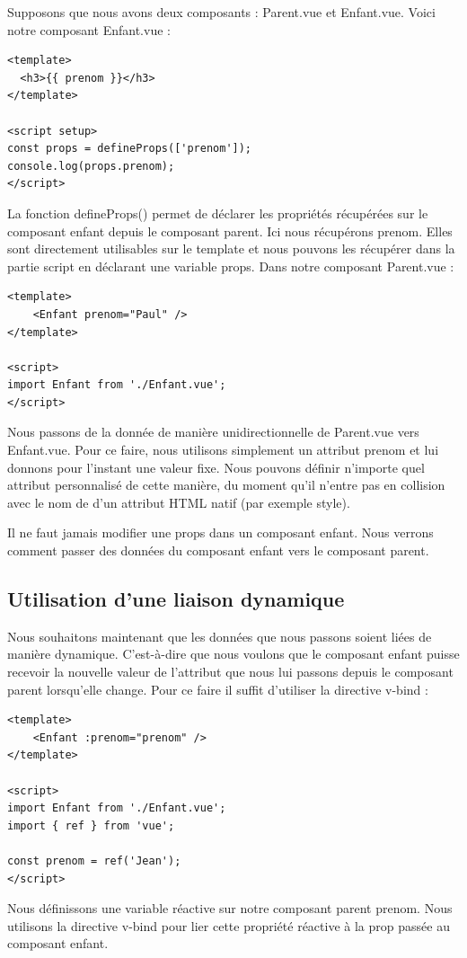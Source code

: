 \documentclass{article}
\begin{document}
Supposons que nous avons deux composants : {\color{monOrange}Parent.vue} et {\color{monOrange}Enfant.vue}. Voici notre composant {\color{monOrange}Enfant.vue} :
\begin{verbatim}
<template>
  <h3>{{ prenom }}</h3>
</template>

<script setup>
const props = defineProps(['prenom']);
console.log(props.prenom);
</script>
\end{verbatim}
La fonction {\color{monOrange}defineProps()} permet de déclarer les propriétés récupérées sur le composant enfant depuis le composant parent. Ici nous récupérons {\color{monOrange}prenom}. Elles sont directement utilisables sur le {\color{monOrange}template} et nous pouvons les récupérer dans la partie {\color{monOrange}script} en déclarant une variable {\color{monOrange}props}. Dans notre composant {\color{monOrange}Parent.vue} :
\begin{verbatim}
<template>
    <Enfant prenom="Paul" />
</template>

<script>
import Enfant from './Enfant.vue';
</script>
\end{verbatim}
Nous passons de la donnée de manière unidirectionnelle de {\color{monOrange}Parent.vue} vers {\color{monOrange}Enfant.vue}. Pour ce faire, nous utilisons simplement un attribut {\color{monOrange}prenom} et lui donnons pour l'instant une valeur fixe. Nous pouvons définir n'importe quel attribut personnalisé de cette manière, du moment qu'il n'entre pas en collision avec le nom de d'un attribut HTML natif (par exemple {\color{monOrange}style}).

Il ne faut jamais modifier une {\color{monOrange}props} dans un composant enfant. Nous verrons comment passer des données du composant enfant vers le composant parent.

\subsection{Utilisation d'une liaison dynamique}
Nous souhaitons maintenant que les données que nous passons soient liées de manière dynamique. C'est-à-dire que nous voulons que le composant enfant puisse recevoir la nouvelle valeur de l'attribut que nous lui passons depuis le composant parent lorsqu'elle change. Pour ce faire il suffit d'utiliser la directive {\color{monOrange}v-bind} :
\begin{verbatim}
<template>
    <Enfant :prenom="prenom" />
</template>

<script>
import Enfant from './Enfant.vue';
import { ref } from 'vue';

const prenom = ref('Jean');
</script>
\end{verbatim}
Nous définissons une variable réactive sur notre composant parent {\color{monOrange}prenom}. Nous utilisons la directive {\color{monOrange}v-bind} pour lier cette propriété réactive à la {\color{monOrange}prop} passée au composant enfant.
\end{document}
